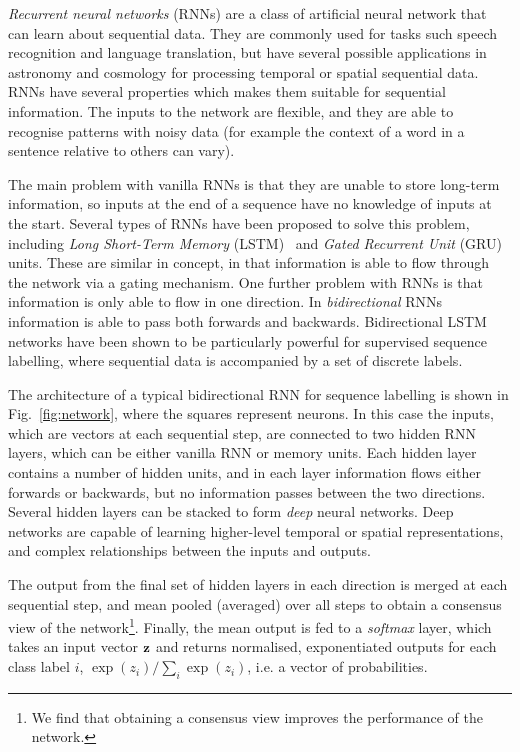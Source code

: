\documentclass[nofootinbib,amsmath,amssymb,10pt,eqsecnum, twocolumn]{revtex4-1}
\begin{document}
{\em Recurrent neural networks} (RNNs) are a class of artificial neural network  that can learn about sequential data. They are commonly used for tasks such speech recognition and language translation, but have several possible applications in astronomy  and cosmology for processing temporal or spatial sequential data. RNNs have several properties which makes them suitable for sequential information. The inputs to the network are flexible, and they are able to recognise patterns with noisy data (for example the context of a word in a sentence relative to others can vary). 

The main problem with vanilla RNNs  is that they are unable to store long-term information, so inputs at the end of a sequence have no knowledge of inputs at the start. Several types of RNNs have been proposed to solve this problem, including {\em Long Short-Term Memory} (LSTM)~\cite{LSTM} and {\em Gated Recurrent Unit} (GRU)~\cite{2014arXiv1412.3555C} units. These are similar in concept, in that information is able to flow through the network via a gating mechanism. One further problem with RNNs is that information is only able to flow in one direction. In {\em bidirectional} RNNs information is able to pass both forwards and backwards. Bidirectional LSTM networks have been shown to be particularly powerful for supervised sequence labelling, where sequential data is accompanied by a set of discrete labels. 

The architecture of a typical bidirectional RNN for sequence labelling is shown in Fig.~\ref{fig:network}, where the squares represent {\rm neurons}. In this case the inputs, which are vectors at each sequential step, are connected to two hidden RNN layers, which can be either vanilla RNN or memory units.  Each hidden layer contains a number of hidden units, and in each layer information flows either forwards or backwards,  but no information passes between the two directions. Several hidden layers can be stacked to form {\em deep} neural networks. Deep networks are capable of learning higher-level temporal or spatial representations, and complex relationships between the inputs and outputs.

The output from the final set of hidden layers in each direction is merged at each sequential step, and mean pooled (averaged) over all steps to obtain a consensus view of the network\footnote{We find that obtaining a consensus view improves the performance of the network.}. Finally, the mean output is fed to a {\em softmax} layer, which takes an input vector ${\bf z}$ and returns normalised, exponentiated outputs for each class label $i$, $\exp(z_i) / \sum_{i} \exp(z_i)$, i.e. a vector of probabilities.
\end{document}
